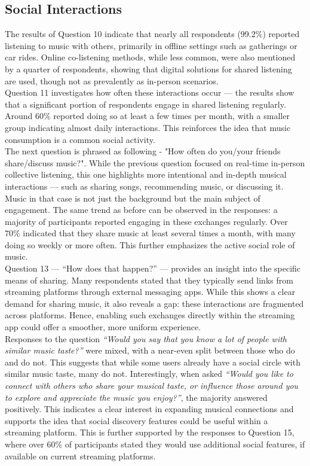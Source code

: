 \subsection{Social Interactions}
The results of Question 10 indicate that nearly all respondents (99.2\%) reported listening to music with
others, primarily in offline settings such as gatherings or car rides.
Online co-listening methods, while less common, were also mentioned by a quarter of respondents,
showing that digital solutions for shared listening are used, though not as prevalently as in-person scenarios.
\\
Question 11 investigates how often these interactions occur —
the results show that a significant portion of respondents engage in shared listening regularly.
Around 60\% reported doing so at least a few times per month,
with a smaller group indicating almost daily interactions.
This reinforces the idea that music consumption is a common social activity.
\\
The next question is phrased as following - "How often do you/your friends share/discuss music?".
While the previous question focused on real-time in-person collective listening,
this one highlights more intentional and in-depth musical interactions — such as sharing songs,
recommending music, or discussing it. Music in that case is not just the background but the main subject of engagement.
The same trend as before can be observed in the responses: a majority of participants reported engaging in these exchanges regularly.
Over 70\% indicated that they share music at least several times a month, with many doing so weekly or more often.
This further emphasizes the active social role of music.
\\
Question 13 — “How does that happen?” — provides an insight into the specific means of sharing.
Many respondents stated that they typically send links from streaming platforms through external messaging apps.
While this shows a clear demand for sharing music, it also reveals a gap: these interactions are fragmented across platforms.
Hence, enabling such exchanges directly within the streaming app could offer a smoother, more uniform experience.
\\
Responses to the question \textit{“Would you say that you know a lot of people with similar music taste?”} were mixed,
with a near-even split between those who do and do not.
This suggests that while some users already have a social circle with similar music taste, many do not.
Interestingly, when asked
\textit{“Would you like to connect with others who share your musical taste, or influence those around you to explore and appreciate the music you enjoy?”},
the majority answered positively.
This indicates a clear interest in expanding musical connections and supports the idea that social discovery
features could be useful within a streaming platform.
This is further supported by the responses to Question 15, where over 60\% of participants stated they would use
additional social features, if available on current streaming platforms.



